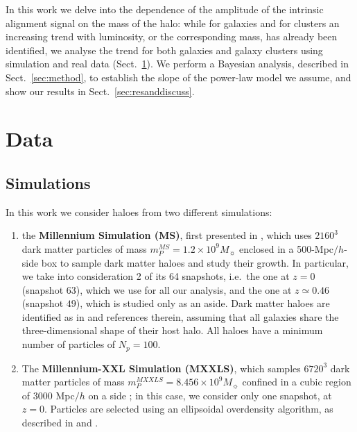\documentclass[a4paper,fleqn,usenatbib]{mnras}
\begin{document}
In this work we delve into the dependence of the amplitude of the intrinsic alignment signal on the mass of the halo: while for galaxies \citep{Joachimietal2011, Singhetal2015} and for clusters \citep{vanUitertJoachimi2017} an increasing trend with luminosity, or the corresponding mass, has already been identified, we analyse the trend for both galaxies and galaxy clusters using simulation and real data (Sect.~\ref{sec:data}). We perform a Bayesian analysis, described in Sect.~\ref{sec:method}, to establish the slope of the power-law model we assume, and show our results in Sect.~\ref{sec:resanddiscuss}.
\section{Data}
\label{sec:data}
\subsection{Simulations}
\label{subsec:sim}
In this work we consider haloes from two different simulations: 
\begin{enumerate}
\item the \textbf{Millennium Simulation (MS)}, first presented in \citet{Springeletal2005}, which uses $2160^3$ dark matter particles of mass $m_P^{MS} =1.2 \times 10^9 M_{\sun}$ enclosed in a 500-Mpc$/h$-side box to sample dark matter haloes and study their growth. In particular, we take into consideration 2 of its 64 snapshots, i.e.\ the one at $z = 0$ (snapshot $63$), which we use for all our analysis, and the one at $z \simeq 0.46$ (snapshot $49$), which is studied only as an aside. Dark matter haloes are identified as in \citet{Joachimietal2013a} and references therein, assuming that all galaxies share the three-dimensional shape of their host halo. All haloes have a minimum number of particles of $N_p = 100$.
\item The \textbf{Millennium-XXL Simulation (MXXLS)}, which samples $6720^3$ dark matter particles of mass $m_P^{MXXLS} = 8.456 \times 10^9 M_{\sun}$ confined in a cubic region of $3000$ Mpc$/h$ on a side \citep{Anguloetal2012}; in this case, we consider only one snapshot, at $z = 0$. Particles are selected using an ellipsoidal overdensity algorithm, as described in \citet{Despalietal2013} and \citet{Bonamigoetal2015}.
\end{enumerate} 
\end{document}
